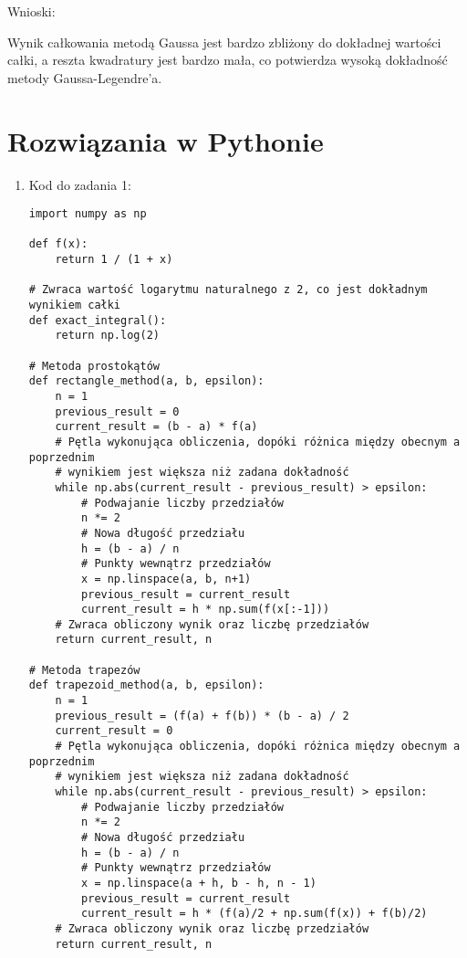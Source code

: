 \documentclass[10pt]{article}
\begin{document}
\begin{enumerate}
Wnioski:

Wynik całkowania metodą Gaussa jest bardzo zbliżony do dokładnej wartości całki, a reszta kwadratury jest bardzo mała, co potwierdza wysoką dokładność metody Gaussa-Legendre'a.

\end{enumerate}
\newpage
\section*{Rozwiązania w Pythonie}
\begin{adjustwidth}{-1.5cm}{-1.5cm}
\begin{enumerate} 
\item Kod do zadania 1:
\begin{verbatim}
import numpy as np  

def f(x):  
    return 1 / (1 + x)  
    
# Zwraca wartość logarytmu naturalnego z 2, co jest dokładnym wynikiem całki    
def exact_integral():  
    return np.log(2)  
    
# Metoda prostokątów
def rectangle_method(a, b, epsilon): 
    n = 1  
    previous_result = 0  
    current_result = (b - a) * f(a) 
    # Pętla wykonująca obliczenia, dopóki różnica między obecnym a poprzednim
    # wynikiem jest większa niż zadana dokładność
    while np.abs(current_result - previous_result) > epsilon: 
        # Podwajanie liczby przedziałów 
        n *= 2  
        # Nowa długość przedziału
        h = (b - a) / n  
        # Punkty wewnątrz przedziałów
        x = np.linspace(a, b, n+1)  
        previous_result = current_result  
        current_result = h * np.sum(f(x[:-1])) 
    # Zwraca obliczony wynik oraz liczbę przedziałów 
    return current_result, n  
    
# Metoda trapezów
def trapezoid_method(a, b, epsilon):  
    n = 1
    previous_result = (f(a) + f(b)) * (b - a) / 2 
    current_result = 0  
    # Pętla wykonująca obliczenia, dopóki różnica między obecnym a poprzednim
    # wynikiem jest większa niż zadana dokładność
    while np.abs(current_result - previous_result) > epsilon:
        # Podwajanie liczby przedziałów
        n *= 2  
        # Nowa długość przedziału
        h = (b - a) / n 
        # Punkty wewnątrz przedziałów
        x = np.linspace(a + h, b - h, n - 1)  
        previous_result = current_result  
        current_result = h * (f(a)/2 + np.sum(f(x)) + f(b)/2)
    # Zwraca obliczony wynik oraz liczbę przedziałów 
    return current_result, n 
    

\end{verbatim}
\end{enumerate}
\end{adjustwidth}
\end{document}
